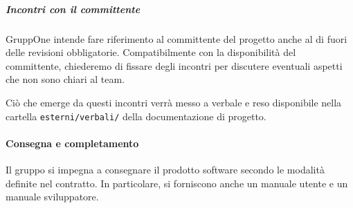 \documentclass[../../norme-di-progetto.tex]{subfiles}
\begin{document}
\subparagraph{Incontri con il committente}%
\label{subp:incontri_con_il_committente}

GruppOne intende fare riferimento al committente del progetto anche al di fuori delle revisioni obbligatorie.
Compatibilmente con la disponibilità del committente, chiederemo di fissare degli incontri per discutere eventuali aspetti che non sono chiari al team.

Ciò che emerge da questi incontri verrà messo a verbale e reso disponibile nella cartella \verb|esterni/verbali/| della documentazione di progetto.

\paragraph{Consegna e completamento}%
\label{par:consegna e completamento}

Il gruppo si impegna a consegnare il prodotto software secondo le modalità definite nel contratto. In particolare, si forniscono anche un manuale utente e un manuale sviluppatore.


\end{document}
